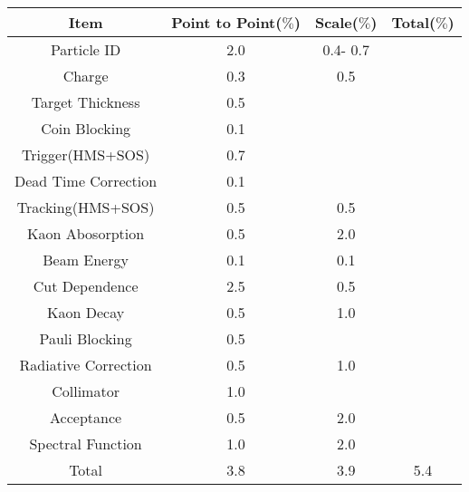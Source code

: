 \begin{center}
\begin{tabular}{||c|c|c|c||}\hline
 Item & Point to Point($\%$) & Scale($\%$) & Total($\%$) \\\hline
Particle ID 				 & 2.0 & 0.4- 0.7 & \\\hline
Charge 							 & 0.3 & 		0.5	  & \\
Target Thickness 		 & 0.5 & 			    & \\
Coin Blocking 			 & 0.1 & 				  & \\
Trigger(HMS+SOS)  	 & 0.7 & 				  & \\
Dead Time Correction & 0.1 & 				  & \\
Tracking(HMS+SOS) 	 & 0.5 & 		0.5	  & \\
Kaon Abosorption	 	 & 0.5 &    2.0	  & \\
Beam Energy					 & 0.1 &    0.1   & \\\hline
Cut Dependence		 	 & 2.5 & 		0.5	  & \\\hline
Kaon Decay				 	 & 0.5 & 		1.0	  & \\
Pauli Blocking		 	 & 0.5 & 				  & \\
Radiative Correction & 0.5 & 		1.0	  & \\
Collimator				 	 & 1.0 & 				  & \\
Acceptance				 	 & 0.5 &		2.0		& \\
Spectral Function		 & 1.0 & 		2.0	  & \\\hline\hline
Total							 	 & 3.8 & 		3.9	  & 5.4\\\hline
\end{tabular}
\end{center}